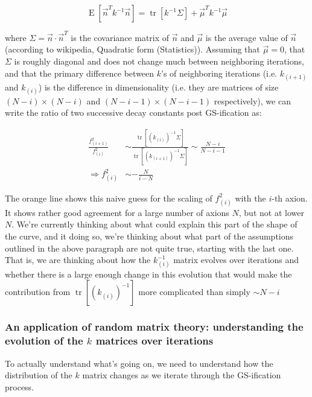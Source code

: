 \documentclass{article}
\begin{document}
\begin{equation}
    \displaystyle \operatorname {E} \left[\vec{n} ^{T} k^{-1} \vec{n} \right]=\operatorname {tr} \left[k^{-1} \Sigma \right]+\vec{\mu} ^{T} k^{-1} \vec{\mu}
\end{equation}

\noindent where $\Sigma = \vec{n}\cdot \vec{n}^T$ is the covariance matrix of $\vec{n}$ and $\vec{\mu}$ is the average value of $\vec{n}$ (according to wikipedia, Quadratic form (Statistics)). Assuming that $\vec{\mu}=0$, that $\Sigma$ is roughly diagonal and does not change much between neighboring iterations, and that the primary difference between $k$'s of neighboring iterations (i.e. $k_{(i+1)}$ and $k_{(i)}$) is the difference in dimensionality (i.e. they are matrices of size $(N-i)\times (N-i)$ and $(N-i-1)\times (N-i-1)$ respectively), we can write the ratio of two successive decay constants post GS-ification as:

\begin{align}
    \frac{f_{(i+1)}^2}{f_{(i)}^2} & \sim \frac{ \operatorname {tr} \left[(k_{(i)})^{-1} \Sigma \right]}{\operatorname {tr} \left[(k_{(i+1)})^{-1} \Sigma \right]} \sim \frac{N-i}{N-i-1} \\
    \Rightarrow f_{(i)}^2 & \sim - \frac{N}{i-N} \label{eq:scaling-f-vs.iaxion}
\end{align}

The orange line shows this naive guess for the scaling of $f_{(i)}^2$ with the $i$-th axion. It shows rather good agreement for a large number of axions $N$, but not at lower $N$. We're currently thinking about what could explain this part of the shape of the curve, and it doing so, we're thinking about what part of the assumptions outlined in the above paragraph are not quite true, starting with the last one. That is, we are thinking about how the $k^{-1}_{(i)}$ matrix evolves over iterations and whether there is a large enough change in this evolution that would make the contribution from $\operatorname {tr} \left[(k_{(i)})^{-1}\right]$ more complicated than simply $\sim N-i$

\subsubsection{An application of random matrix theory: understanding the evolution of the $k$ matrices over iterations}


To actually understand what's going on, we need to understand how the distribution of the $k$ matrix changes as we iterate through the GS-ification process.
\end{document}
